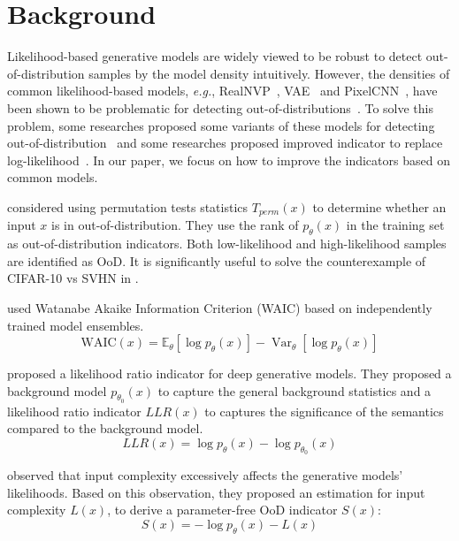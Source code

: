 \documentclass[letterpaper]{article} %
\newcommand{\EG}{\textit{e.g.}, }
\begin{document}
\section{Background}
Likelihood-based generative models are widely viewed to be robust to detect out-of-distribution samples by the model density intuitively. However, the densities of common likelihood-based models, \EG RealNVP~\cite{dinh2016density}, VAE~\cite{tomczak2018vae,takahashi2019variational} and PixelCNN~\cite{van2016conditional}, have been shown to be problematic for detecting out-of-distributions~\cite{nalisnick2018deep}. 
To solve this problem, some researches proposed some variants of these models for detecting out-of-distribution~\cite{che2019deep} and some researches proposed improved indicator to replace log-likelihood~\cite{serra2019input}. In our paper, we focus on how to improve the indicators based on common models. 

\cite{song2017pixeldefend} considered using permutation tests statistics $T_{perm}(x)$ to determine whether an input $x$ is in out-of-distribution. They use the rank of $p_\theta(x)$ in the training set as out-of-distribution indicators. Both low-likelihood and high-likelihood samples are identified as OoD. It is significantly useful to solve the counterexample of CIFAR-10 vs SVHN in \cite{nalisnick2018deep}. 

\cite{choi2018waic} used Watanabe Akaike Information Criterion (WAIC) based on independently trained model ensembles.
\begin{equation}
	\text{WAIC}(x) = \mathbb{E}_{\theta} [\log p_\theta(x)] - \operatorname{Var}_{\theta} [\log p_\theta(x)]
\end{equation}

\cite{ren2019likelihood} proposed a likelihood ratio indicator for deep generative models. They proposed a background model $p_{\theta_0}(x)$ to capture the general background statistics and a likelihood ratio indicator $LLR(x)$ to captures the significance of the semantics compared to the background model. 
\begin{equation}
LLR(x) = \log p_\theta(x) - \log p_{\theta_0}(x)
\end{equation}

\cite{nalisnick2018deep} observed that input complexity excessively affects the generative models' likelihoods. Based on this observation, they proposed an estimation for input complexity $L(x)$, to derive a parameter-free OoD indicator $S(x)$:
\begin{equation}
	S(x) = -\log p_\theta(x) - L(x)
\end{equation}
\end{document}
